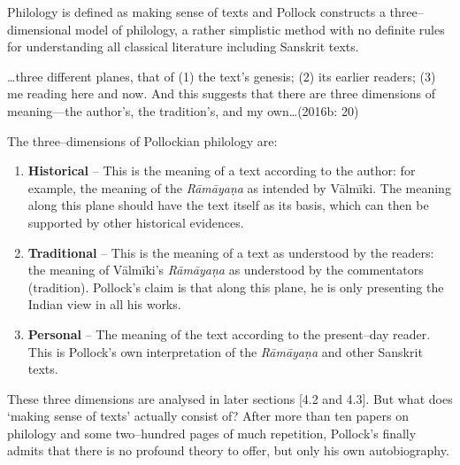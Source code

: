 Philology is defined as making sense of texts and Pollock constructs a three–dimensional model of philology, a rather simplistic method with no definite rules for understanding all classical literature including Sanskrit texts.

\begin{myquote}
…three different planes, that of (1) the text’s genesis; (2) its earlier readers; (3) me reading here and now. And this suggests that there are three dimensions of meaning—the author’s, the tradition’s, and my own…(2016b: 20)
\end{myquote}

The three–dimensions of Pollockian philology are:

\begin{enumerate}
\itemsep=0pt
\item \textbf{Historical} – This is the meaning of a text according to the author: for example, the meaning of the \textit{Rāmāyaṇa} as intended by Vālmīki. The meaning along this plane should have the text itself as its basis, which can then be supported by other historical evidences.

 \item \textbf{Traditional} – This is the meaning of a text as understood by the readers: the meaning of Vālmīki’s \textit{Rāmāyaṇa} as understood by the commentators (tradition). Pollock’s claim is that along this plane, he is only presenting the Indian view in all his works.

 \item \textbf{Personal} – The meaning of the text according to the present–day reader. This is Pollock’s own interpretation of the \textit{Rāmāyaṇa} and other Sanskrit texts.

\end{enumerate}

These three dimensions are analysed in later sections [4.2 and 4.3]. But what does ‘making sense of texts’ actually consist of? After more than ten papers on philology and some two–hundred pages of much repetition, Pollock’s finally admits that there is no profound theory to offer, but only his own autobiography.

